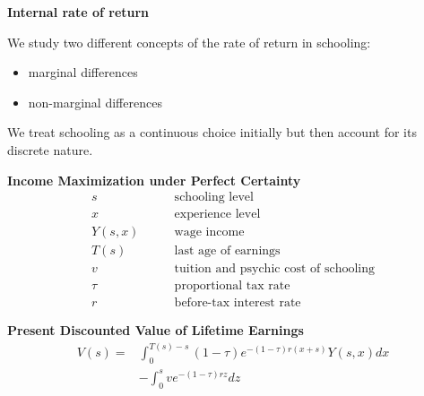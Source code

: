 \begin{frame}\begin{center}
\LARGE\textbf{Internal rate of return}
\end{center}\end{frame}
\begin{frame}
We study two different concepts of the rate of return in schooling:

\vspace{0.3cm}
\begin{itemize}\setlength\itemsep{1em}
\item marginal differences
\item non-marginal differences\vspace{0.3cm}
\end{itemize}

We treat schooling as a continuous choice initially but then account for its discrete nature.

\end{frame}
\begin{frame}
\textbf{Income Maximization under Perfect Certainty \nocite{Rosen.1977,Willis.1979}}
\begin{align*}
s               &\qquad\text{schooling level} \\
x               &\qquad\text{experience level} \\
Y(s, x)         &\qquad\text{wage income} \\
T(s)            &\qquad\text{last age of earnings} \\
v               &\qquad\text{tuition and psychic cost of schooling} \\
\tau            &\qquad\text{proportional tax rate} \\
r               &\qquad\text{before-tax interest rate}
\end{align*}
\end{frame}
\begin{frame}
\textbf{Present Discounted Value of Lifetime Earnings}
\begin{align*}
V(s) = & \int_0^{T(s) - s} (1 - \tau) e^{-(1 - \tau)r(x + s)} Y(s,x) dx \\
       & - \int^s_0 ve^{-(1 - \tau)rz}dz
\end{align*}
\end{frame}
